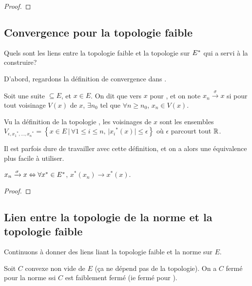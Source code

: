 \begin{proof}
	
\end{proof}

\subsection{Convergence pour la topologie faible}
Quels sont les liens entre la topologie faible et la topologie sur $E^{*}$
qui a servi à la construire?

D'abord, regardons la définition de convergence dans .
\begin{definition}
	Soit une suite  $\subseteq E$, et $x \in E$.
	On dit que  vers $x$ pour , et on
	note $x_{n} \xrightarrow{\sigma} x$ si pour tout
	voisinage $V(x)$ de $x$, $\exists n_{0}$ tel que $\forall n \geq n_{0}$,
	$x_{n} \in V(x)$.
\end{definition}

Vu la définition de la topologie , les voisinages de $x$ sont les
ensembles $V_{\epsilon, {x_{1}}^{*}, \ldots, {x_{n}}^{*}} = \left\{x \in E \, |
	\, \forall 1 \leq i \leq n, \, |{x_{i}}^{*}(x)| \leq \epsilon \right\}$ où
	$\epsilon$ parcourt tout $\mathbb{R}$.

Il est parfois dure de travailler avec cette définition, et on a alors une
équivalence plus facile à utiliser.

\begin{proposition}
	$x_{n} \xrightarrow{\sigma} x \Leftrightarrow \forall x^{*} \in E^{*}$,
	$x^{*}(x_{n}) \rightarrow x^{*}(x)$.
\end{proposition}

\begin{proof}
	
\end{proof}

\subsection{Lien entre la topologie de la norme et la topologie faible}

Continuons à donner des liens liant la topologie faible et la norme sur $E$.

\begin{proposition}
	Soit $C$ convexe non vide de $E$ (ça ne dépend pas de la topologie).
	On a $C$ fermé pour la norme ssi $C$ est faiblement fermé (ie fermé pour
	).
\end{proposition}

